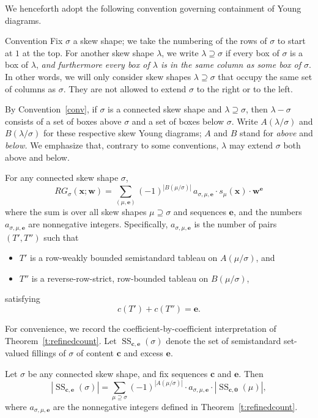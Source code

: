 \documentclass[ALCO,ThmDefs,Unicode,epreuves]{cedram}
\DeclareMathOperator{\Semi}{SS}
\newcommand{\bfc}{\mathbf{c}}
\newcommand{\bfe}{\mathbf{e}}
\newcommand{\bfw}{\mathbf{w}}
\newcommand{\bfx}{\mathbf{x}}
\begin{document}
We henceforth adopt the following convention governing containment of Young diagrams. 
\begin{enonce}{Convention}\label{conv}
Fix $\sigma$ a skew shape; we take the numbering of the rows of $\sigma$ to start at $1$ at the top. For another skew shape $\lambda$, we write $\lambda \supseteq \sigma$ if every box of $\sigma$ is a box of $\lambda$, \emph{and furthermore every box of $\lambda$ is in the same column as some box of $\sigma$}. In other words, we will only consider skew shapes $\lambda\supseteq \sigma$ that occupy the same set of columns as $\sigma$. They are not allowed to extend $\sigma$ to the right or to the left.
\end{enonce}

By Convention~\ref{conv}, if $\sigma$ is a connected skew shape and $\lambda\supseteq \sigma$, then $\lambda - \sigma$ consists of a set of boxes above $\sigma$ and a set of boxes below $\sigma$. Write $A(\lambda/\sigma)$ and $B(\lambda/\sigma)$ for these respective skew Young diagrams; $A$ and $B$ stand for \emph{above} and \emph{below.} We emphasize that, contrary to some conventions, $\lambda$ may extend $\sigma$ both above and below.



\begin{theorem}\label{t:refinedcount} For any connected skew shape $\sigma$, 
\[
RG_\sigma(\bfx;\bfw) = \sum_{(\mu,\bfe)} (-1)^{| B(\mu/\sigma)|} \,a_{\sigma,\mu,\bfe} \cdot s_\mu(\bfx) \cdot\bfw^\bfe 
\]
where the sum is over all skew shapes $\mu\supseteq \sigma$ and sequences $\bfe$, and the numbers $a_{\sigma,\mu,\bfe}$ are nonnegative integers. Specifically, $a_{\sigma,\mu,\bfe}$ is the number of pairs $(T',T'')$ such that
\begin{itemize}
\item $T'$ is a row-weakly bounded semistandard tableau on $A(\mu/\sigma)$, and
\item $T''$ is a reverse-row-strict, row-bounded tableau on $B(\mu/\sigma)$, 
\end{itemize}
satisfying 
\[
c(T') + c(T'') = \bfe.
\]
\end{theorem}

For convenience, we record the coefficient-by-coefficient interpretation of Theorem~\ref{t:refinedcount}. Let $\Semi_{\bfc,\bfe}(\sigma)$ denote the set of semistandard set-valued fillings of $\sigma$ of content $\bfc$ and excess $\bfe$.

\begin{theorem} \label{t:refinedcount'} Let $\sigma$ be any connected skew shape, and fix sequences $\bfc$ and $\bfe$. Then 
\[
|\Semi_{\bfc,\bfe}(\sigma)| = \sum_{\mu \supseteq \sigma} (-1)^{|A(\mu/\sigma)|} \cdot a_{\sigma,\mu,\bfe} \cdot |\Semi_{\bfc, \mathbf{0}} (\mu)|,
\]
where $a_{\sigma,\mu,\bfe}$ are the nonnegative integers defined in Theorem~\ref{t:refinedcount}.
\end{theorem}
\end{document}
